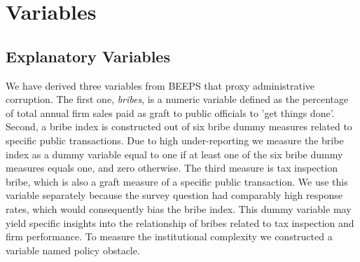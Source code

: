 \section{Variables}
\subsection{Explanatory Variables}
We have derived three variables from BEEPS that proxy administrative corruption. The first one, \textit{bribes}, is a numeric variable defined as the percentage of total annual firm sales paid as graft to public officials to 'get things done'. Second, a bribe index is constructed out of six bribe dummy measures related to specific public transactions. Due to high under-reporting we measure the bribe index as a dummy variable equal to one if at least one of the six bribe dummy measures equals one, and zero otherwise. The third measure is tax inspection bribe, which is also a graft measure of a specific public transaction. We use this variable separately because the survey question had comparably high response rates, which would consequently bias the bribe index. This dummy variable may yield specific insights into the relationship of bribes related to tax inspection and firm performance. 
To measure the institutional complexity we constructed a variable named policy obstacle. 
